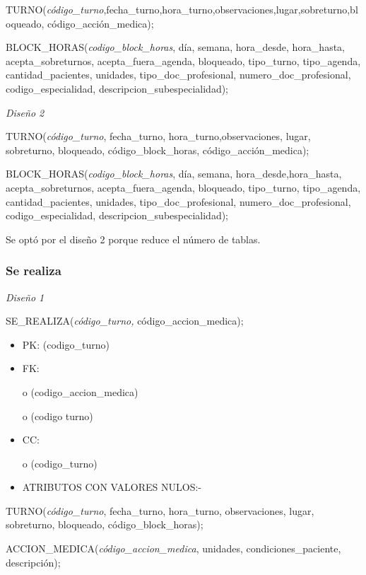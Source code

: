 \documentclass[a4paper,11pt]{article}
\begin{document}
TURNO(\emph{código\_turno},fecha\_turno,hora\_turno,observaciones,lugar,sobreturno,bloqueado, 
código\_acción\_medica);

BLOCK\_HORAS(\emph{codigo\_block\_horas}, día, semana, hora\_desde, hora\_hasta, 
acepta\_sobreturnos, acepta\_fuera\_agenda, bloqueado, tipo\_turno, tipo\_agenda, 
cantidad\_pacientes, unidades,\emph{ }tipo\_doc\_profesional, numero\_doc\_profesional, 
codigo\_especialidad, descripcion\_subespecialidad);

\textit{Diseño 2}

TURNO(\emph{código\_turno}, fecha\_turno, hora\_turno,observaciones, lugar, sobreturno, 
bloqueado, código\_block\_horas, código\_acción\_medica);

BLOCK\_HORAS(\emph{codigo\_block\_horas}, día, semana, hora\_desde,hora\_hasta, 
acepta\_sobreturnos, acepta\_fuera\_agenda, bloqueado, tipo\_turno, tipo\_agenda, 
cantidad\_pacientes, unidades,\emph{ }tipo\_doc\_profesional, numero\_doc\_profesional, 
codigo\_especialidad, descripcion\_subespecialidad);

Se optó por el diseño 2 porque reduce el número de tablas.\label{HToc293405850}

\subsubsection{\textbf{Se realiza}}

\textit{Diseño 1}

SE\_REALIZA(\emph{código\_turno, }código\_accion\_medica);

\begin{itemize}
\item PK: (codigo\_turno)

\item FK: 

o (codigo\_accion\_medica)

o (codigo turno)

\item CC:

o (codigo\_turno)

\item ATRIBUTOS CON VALORES NULOS:-
\end{itemize}

TURNO(\emph{código\_turno}, fecha\_turno, hora\_turno, observaciones, lugar, sobreturno, 
bloqueado, código\_block\_horas);

ACCION\_MEDICA(\emph{código\_accion\_medica}, unidades, condiciones\_paciente, 
descripción);
\end{document}
